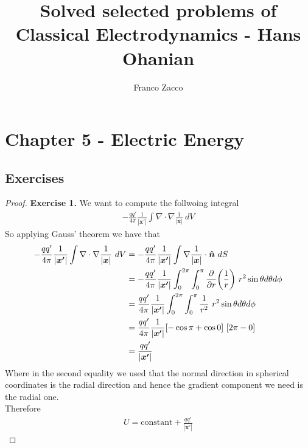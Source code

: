 \documentclass[11pt]{article}
\title{\textbf{Solved selected problems of Classical Electrodynamics - Hans Ohanian}}
\author{Franco Zacco}
\date{}
\newcommand{\hatn}{\bm{\hat{n}}}
\theoremstyle{definition}
\begin{document}
\maketitle
\thispagestyle{empty}

\section*{Chapter 5 - Electric Energy}

\subsection*{Exercises}

\begin{proof}{\textbf{Exercise 1.}}
We want to compute the follwoing integral
\begin{align*}
    -\frac{qq'}{4\pi}\frac{1}{|\bm{x'}|}\int \nabla\cdot\nabla\frac{1}{|\bm{x}|}~dV
\end{align*}
So applying Gauss' theorem we have that
\begin{align*}
    -\frac{qq'}{4\pi}\frac{1}{|\bm{x'}|}\int \nabla\cdot\nabla\frac{1}{|\bm{x}|}~dV
    &= -\frac{qq'}{4\pi}\frac{1}{|\bm{x'}|}
    \int \nabla\frac{1}{|\bm{x}|}\cdot \hatn~dS\\
    &= -\frac{qq'}{4\pi}\frac{1}{|\bm{x'}|}
    \int_0^{2\pi}\int_0^{\pi} \pdv{r}(\frac{1}{r})
    ~r^2\sin\theta d\theta d\phi\\
    &= \frac{qq'}{4\pi}\frac{1}{|\bm{x'}|}
    \int_0^{2\pi}\int_0^{\pi} \frac{1}{r^2}~r^2\sin\theta d\theta d\phi\\
    &= \frac{qq'}{4\pi}\frac{1}{|\bm{x'}|}
    [-\cos\pi + \cos 0]~[2\pi - 0]\\
    &= \frac{qq'}{|\bm{x'}|}
\end{align*}
Where in the second equality we used that the normal direction in spherical
coordinates is the radial direction and hence the gradient component we need
is the radial one.
\\
Therefore
\begin{align*}
    U = \text{constant} + \frac{qq'}{|\bm{x'}|}
\end{align*}
\end{proof}
\end{document}
